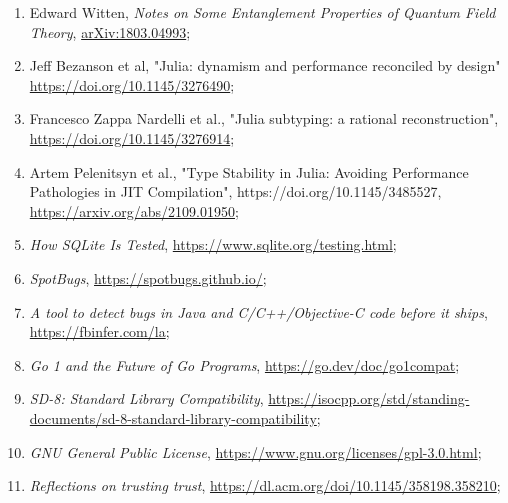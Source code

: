 \documentclass[a4paper,11pt]{article}
\begin{document}
\begin{enumerate}

\item Edward Witten, \emph{Notes on Some Entanglement Properties of
    Quantum Field Theory},
  \href{https://arxiv.org/abs/1803.04993}{arXiv:1803.04993};

\item Jeff Bezanson et al, "Julia: dynamism and performance reconciled
  by design"
  \href{https://doi.org/10.1145/3276490}{https://doi.org/10.1145/3276490};

\item Francesco Zappa Nardelli et al., "Julia subtyping: a rational
  reconstruction",
  \href{https://doi.org/10.1145/3276914}{https://doi.org/10.1145/3276914};

\item Artem Pelenitsyn et al., "Type Stability in Julia: Avoiding
  Performance Pathologies in JIT Compilation",
  https://doi.org/10.1145/3485527,
  \href{arXiv:2109.01950}{https://arxiv.org/abs/2109.01950};

\item \emph{How SQLite Is Tested},
  \href{https://www.sqlite.org/testing.html}{https://www.sqlite.org/testing.html};

\item \emph{SpotBugs},
  \href{https://spotbugs.github.io/}{https://spotbugs.github.io/};

\item \emph{A tool to detect bugs in Java and C/C++/Objective-C code
    before it ships},
  \href{https://fbinfer.com/}{https://fbinfer.com/la};

\item \emph{Go 1 and the Future of Go Programs},
  \href{https://go.dev/doc/go1compat}{https://go.dev/doc/go1compat};

\item \emph{SD-8: Standard Library Compatibility},
  \href{https://isocpp.org/std/standing-documents/sd-8-standard-library-compatibility}{https://isocpp.org/std/standing-documents/sd-8-standard-library-compatibility};

\item \emph{GNU General Public License},
  \href{https://www.gnu.org/licenses/gpl-3.0.html}{https://www.gnu.org/licenses/gpl-3.0.html};

\item \emph{Reflections on trusting trust},
  \href{https://dl.acm.org/doi/10.1145/358198.358210}{https://dl.acm.org/doi/10.1145/358198.358210};


\end{enumerate}
\end{document}

